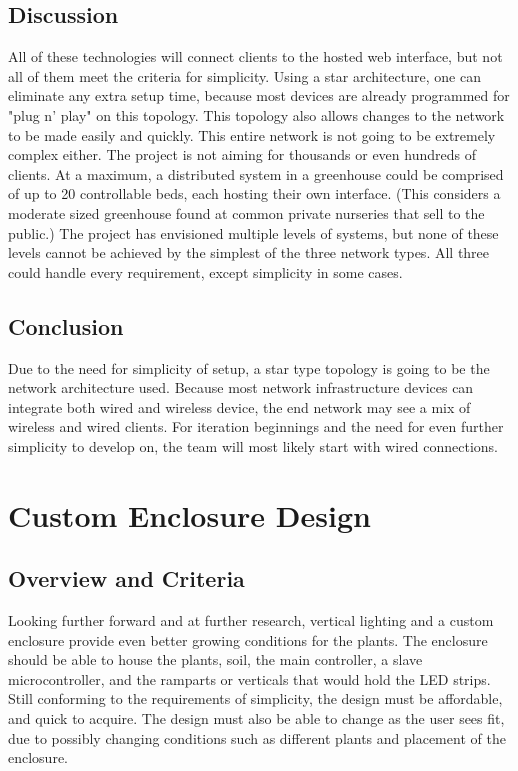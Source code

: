	\subsection{Discussion}
	All of these technologies will connect clients to the hosted web interface, but not all of them meet the criteria for simplicity.
	Using a star architecture, one can eliminate any extra setup time, because most devices are already programmed for "plug n' play" on this topology.
	This topology also allows changes to the network to be made easily and quickly.
	This entire network is not going to be extremely complex either.  The project is not aiming for thousands or even hundreds of clients.
	At a maximum, a distributed system in a greenhouse could be comprised of up to 20 controllable beds, each hosting their own interface.
	(This considers a moderate sized greenhouse found at common private nurseries that sell to the public.) 	The project has envisioned multiple levels of systems,
	but none of these levels cannot be achieved by the simplest of the three network types.  All three could handle every requirement, except simplicity in some cases.

	\subsection{Conclusion}
	Due to the need for simplicity of setup, a star type topology is going to be the network architecture used.
	Because most network infrastructure devices can integrate both wired and wireless device, the end network may see a mix of wireless and wired clients.
	For iteration beginnings and the need for even further simplicity to develop on, the team will most likely start with wired connections.



\section{Custom Enclosure Design}

	\subsection{Overview and Criteria}
	Looking further forward and at further research, vertical lighting and a custom enclosure provide even better growing conditions for the plants.  The enclosure should
	be able to house the plants, soil, the main controller, a slave microcontroller, and the ramparts or verticals that would hold the LED strips.  Still conforming to the
	requirements of simplicity, the design must be affordable, and quick to acquire.  The design must also be able to change as the user sees fit, due to possibly changing
	conditions such as different plants and placement of the enclosure.

